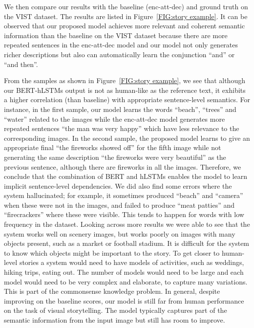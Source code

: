 \documentclass[a4paper,fleqn]{cas-sc}
\begin{document}
We then compare our results with the baseline (enc-att-dec) \citep{Xu2015Show}  and ground truth on the VIST dataset. The results are listed in Figure~\ref{FIG:story example}. It can be observed that our proposed model achieves more relevant and coherent semantic information than the baseline on the VIST dataset because there are more repeated sentences in the enc-att-dec model and our model not only generates richer descriptions but also can automatically learn the conjunction  ``and'' or  ``and then''.


From the samples as shown in Figure~\ref{FIG:story example}, we see that although our BERT-hLSTMs output is not as human-like as the reference text, it exhibits a higher correlation (than baseline) with appropriate sentence-level semantics. For instance, in the first sample, our model learns the words  ``beach'',  ``trees'' and  ``water'' related to the images while the enc-att-dec model generates more repeated sentences  ``the man was very happy'' which have less relevance to the corresponding images. In the second sample, the proposed model learns to give an appropriate final  ``the fireworks showed off'' for the fifth image while not generating the same description  ``the fireworks were very beautiful'' as the previous sentence, although there are fireworks in all the images. Therefore, we conclude that the combination of BERT and hLSTMs enables the model to learn implicit sentence-level dependencies. 
We did also find some errors where the system hallucinated; for example, it sometimes produced ``beach'' and ``camera'' when these were not in the images, and failed to produce  ``meat patties'' and  ``firecrackers'' where these were visible. This tends to happen for words with low frequency in the dataset. 
Looking across more results we were able to see that the system works well on scenery images, but works poorly on  images with  many objects present, such as a market or football stadium. It is difficult for the system to know which objects might be important to the story. To get closer to human-level stories a system would need to have models of activities, such as weddings, hiking trips, eating out. The number of models would need to be large and each model would need to be very complex and elaborate, to capture many variations. This is part of the commonsense knowledge problem.
In general, despite improving on the baseline scores, our model is still far from human performance on the task of visual storytelling. The model typically captures part of the semantic information from the input image but still has room to improve.
\end{document}
